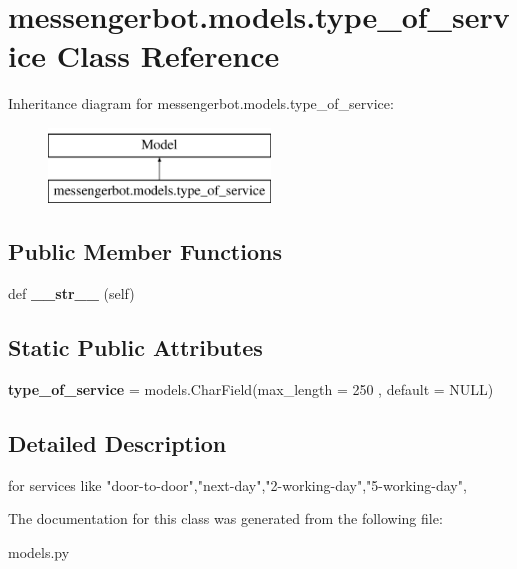\hypertarget{classmessengerbot_1_1models_1_1type__of__service}{}\section{messengerbot.\+models.\+type\+\_\+of\+\_\+service Class Reference}
\label{classmessengerbot_1_1models_1_1type__of__service}
Inheritance diagram for messengerbot.\+models.\+type\+\_\+of\+\_\+service\+:\begin{figure}[H]
\begin{center}
\leavevmode
\includegraphics[height=2.000000cm]{classmessengerbot_1_1models_1_1type__of__service}
\end{center}
\end{figure}
\subsection*{Public Member Functions}
\begin{DoxyCompactItemize}
\item 
\mbox{\label{classmessengerbot_1_1models_1_1type__of__service_ab573c9cf8659e781a2c3ddd8741ff7d2}} 
def {\bfseries \+\_\+\+\_\+str\+\_\+\+\_\+} (self)
\end{DoxyCompactItemize}
\subsection*{Static Public Attributes}
\begin{DoxyCompactItemize}
\item 
\mbox{\label{classmessengerbot_1_1models_1_1type__of__service_a00cc860399c8c70331308d118f5677c9}} 
{\bfseries type\+\_\+of\+\_\+service} = models.\+Char\+Field(max\+\_\+length = 250 , default = \textquotesingle{}N\+U\+LL\textquotesingle{})
\end{DoxyCompactItemize}


\subsection{Detailed Description}
\begin{DoxyVerb}for services like "door-to-door","next-day","2-working-day","5-working-day",\end{DoxyVerb}
 

The documentation for this class was generated from the following file\+:\begin{DoxyCompactItemize}
\item 
models.\+py\end{DoxyCompactItemize}
